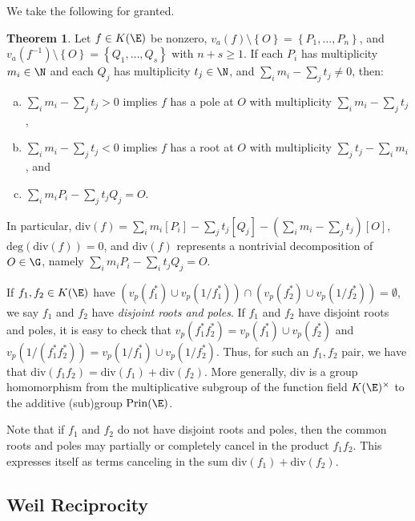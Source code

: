 \documentclass[11pt,letterpaper]{article}
\theoremstyle{definition}
\newtheorem{theorem}{Theorem}[subsection]
\newcommand{\ff}{K(\E)}
\newcommand{\6}{\mathbf}
\newcommand{\7}{\mathcal}
\begin{document}
We take the following for granted.
\begin{theorem}
Let $f \in K(\E)$ be nonzero, $v_a(f) \setminus \left\{O\right\} = \left\{P_1, \ldots, P_n\right\}$, and $v_a(f^{-1}) \setminus \left\{O\right\} = \left\{Q_1, \ldots, Q_s\right\}$ with $n + s \geq 1$. If each $P_i$ has multiplicity $m_i  \in \N$ and each $Q_j$ has multiplicity $t_j \in \N$, and $\sum_i m_i - \sum_j t_j \neq 0$, then:
\begin{enumerate}[(a)]
\item $\sum_i m_i - \sum_j t_j > 0$ implies $f$ has a pole at $O$ with multiplicity $\sum_i m_i - \sum_j t_j$, 
\item $\sum_i m_i - \sum_j t_j < 0$ implies $f$ has a root at $O$ with multiplicity $\sum_j t_j - \sum_i m_i$, and
\item $\sum_i m_i P_i - \sum_j t_j Q_j = O$.
\end{enumerate}
In particular, $\text{div}(f) = \sum_i m_i [P_i] - \sum_j t_j [Q_j] - (\sum_i m_i - \sum_j t_j)[O]$, $\text{deg}(\text{div}(f)) = 0$, and $\text{div}(f)$ represents a nontrivial decomposition of $O \in \G$, namely $\sum_i m_i P_i - \sum_i t_j Q_j = O$.
\end{theorem}


If $f_1, f_2 \in \ff$ have $(v_p(f_1^*) \cup v_p(1/f_1^*)) \cap (v_p(f_2^*) \cup v_p(1/f_2^*)) = \emptyset$, we say $f_1$ and $f_2$ have \textit{disjoint roots and poles}. If $f_1$ and $f_2$ have disjoint roots and poles, it is easy to check that $v_p(f_1^*f_2^*) = v_p(f_1^*)\cup v_p(f_2^*)$ and $v_p(1/(f_1^* f_2^*)) = v_p(1/f_1^*)\cup v_p(1/f_2^*)$. Thus, for such an $f_1, f_2$ pair, we have that $\text{div}(f_1f_2) = \text{div}(f_1)+\text{div}(f_2)$. More generally, $\text{div}$ is a group homomorphism from the multiplicative subgroup of the function field $K(\E)^\times$ to the additive (sub)group $\text{Prin}(\E)$.

Note that if $f_1$ and $f_2$ do not have disjoint roots and poles, then the common roots and poles may partially or completely cancel in the product $f_1f_2$. This expresses itself as terms canceling in the sum $\text{div}(f_1) + \text{div}(f_2)$.



\subsection{Weil Reciprocity}
\end{document}
